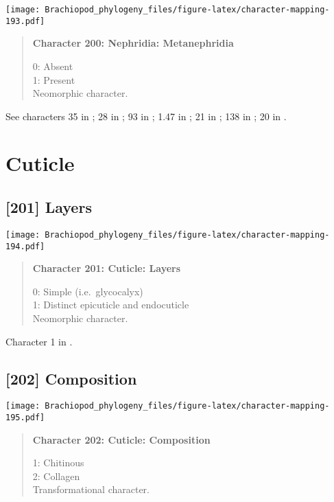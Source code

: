 \documentclass[openany]{book}
\theoremstyle{definition}
\theoremstyle{definition}
\theoremstyle{definition}
\theoremstyle{remark}
\begin{document}
\texttt{[image: Brachiopod\_phylogeny\_files/figure-latex/character-mapping-193.pdf]}

\begin{quote}
\textbf{Character 200: Nephridia: Metanephridia}

0: Absent\\
1: Present\\
Neomorphic character.
\end{quote}

See characters 35 in \citet{Rouse1999}; 28 in \citet{Haszprunar2000}; 93
in \citet{Glenner2004}; 1.47 in \citet{SPS1996}; 21 in
\citet{Grobe2007}; 138 in \citet{Rouse1999}; 20 in
\citet{Haszprunar1996}.

\section{Cuticle}\label{cuticle}

\subsection*{{[}201{]} Layers}\label{layers}

\texttt{[image: Brachiopod\_phylogeny\_files/figure-latex/character-mapping-194.pdf]}

\begin{quote}
\textbf{Character 201: Cuticle: Layers}

0: Simple (i.e.~glycocalyx)\\
1: Distinct epicuticle and endocuticle\\
Neomorphic character.
\end{quote}

Character 1 in \citet{Haszprunar1996}.

\subsection*{{[}202{]} Composition}\label{composition}

\texttt{[image: Brachiopod\_phylogeny\_files/figure-latex/character-mapping-195.pdf]}

\begin{quote}
\textbf{Character 202: Cuticle: Composition}

1: Chitinous\\
2: Collagen\\
Transformational character.
\end{quote}
\end{document}
